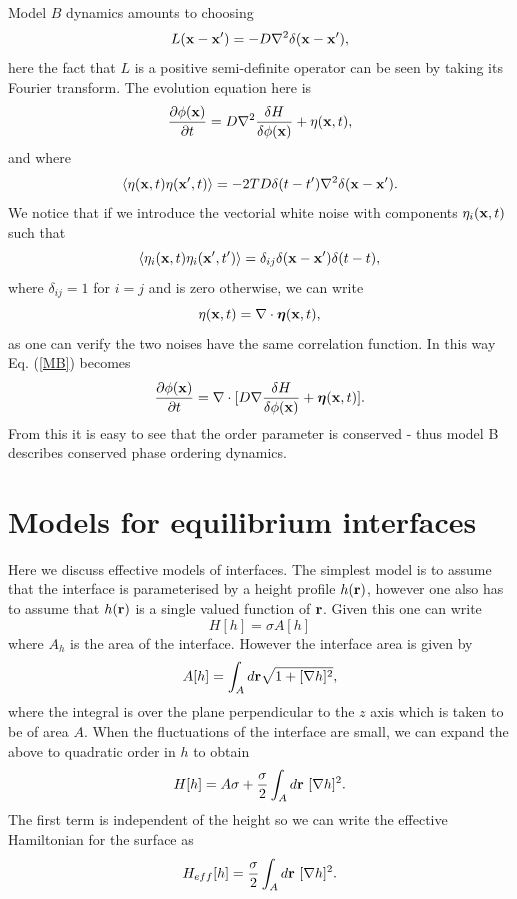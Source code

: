 Model $B$ dynamics amounts to choosing
\begin{equation}
L({\bf x}-{\bf x}')= -D\nabla^2 \delta({\bf x}-{\bf x'}),
\end{equation}
here the fact that $L$ is a positive semi-definite operator can be seen by taking its Fourier transform. The evolution equation here is
\begin{equation}
\frac{\partial \phi({\bf x})}{\partial t}= D\nabla^2 \frac{\delta H}{\delta \phi({\bf x})} + \eta({\bf x},t),
\label{MB}
\end{equation}
and where
\begin{equation}
\langle \eta({\bf x},t)\eta({\bf x}',t)\rangle =-2TD   \delta(t-t')\nabla^2\delta({\bf x}-{\bf x'}).
\end{equation}
We notice that if we introduce the vectorial white noise with components $\eta_i({\bf x},t)$ such that
\begin{equation}
\langle \eta_i({\bf x},t) \eta_i({\bf x}',t')\rangle =\delta_{ij} \delta({\bf x}-{\bf x'})\delta(t-t),
\end{equation}
where $\delta_{ij}=1$ for $i=j$ and is zero otherwise,  we can write
\begin{equation}
\eta({\bf x},t)= \nabla\cdot {\boldsymbol \eta}({\bf x},t),
\end{equation}
as one can verify the two noises have the same correlation function. In this way Eq. (\ref{MB}) becomes 
\begin{equation}
\frac{\partial \phi({\bf x})}{\partial t}= \nabla\cdot[ D\nabla \frac{\delta H}{\delta \phi({\bf x})} + {\boldsymbol\eta}({\bf x},t)].
\end{equation}
From this it is easy to see that the order parameter is conserved - thus model  B describes conserved phase ordering dynamics.

\section{Models for equilibrium interfaces}
Here we discuss effective models of interfaces. The simplest model is to assume that the 
interface is parameterised by a height profile $h({\bf r})$, however one also has to assume that 
$h({\bf r})$ is a single valued function of ${\bf r}$. Given this one can write
\begin{equation}
H[h] = \sigma A[h]
\end{equation}
where $A_h$ is the area of the interface. However the interface area is given by
\begin{equation}
A[h] = \int_A d{\bf r}\sqrt{1+[\nabla h]^2},
\end{equation}
where the integral is over the plane perpendicular to the $z$ axis which is taken to be of area $A$. When the fluctuations of the interface are small, we can expand the above to quadratic order in $h$ to obtain
\begin{equation}
H[h]= A\sigma +\frac{\sigma}{2} \int_A d{\bf r} \ [\nabla h]^2.
\end{equation}
The first term is independent of the height so we can write the effective Hamiltonian for the surface as
\begin{equation}
H_{eff} [h]= \frac{\sigma}{2} \int_A d{\bf r}\  [\nabla h]^2.\label{heff}
\end{equation}
